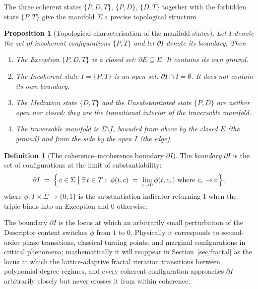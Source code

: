 \documentclass[11pt,a4paper]{article}
\newtheorem{proposition}[theorem]{Proposition}
\theoremstyle{definition}
\newtheorem{definition}[theorem]{Definition}
\theoremstyle{remark}
\newcommand{\eps}{\varepsilon}
\begin{document}
The three coherent states $\{P,D,T\}$, $\{P,D\}$, $\{D,T\}$ together with the forbidden state $\{P,T\}$ give the manifold $\Sigma$ a precise topological structure.

\begin{proposition}[Topological characterisation of the manifold states]\label{prop:topology}
Let $I$ denote the set of incoherent configurations $\{P,T\}$ and let $\partial I$ denote its boundary. Then
\begin{enumerate}[label=(\roman*),leftmargin=*]
\item The Exception $\{P,D,T\}$ is a closed set: $\partial E \subseteq E$. It contains its own ground.
\item The Incoherent state $I = \{P,T\}$ is an open set: $\partial I \cap I = \emptyset$. It does not contain its own boundary.
\item The Mediation state $\{D,T\}$ and the Unsubstantiated state $\{P,D\}$ are neither open nor closed; they are the transitional interior of the traversable manifold.
\item The traversable manifold is $\Sigma \setminus I$, bounded from above by the closed $E$ (the ground) and from the side by the open $I$ (the edge).
\end{enumerate}
\end{proposition}

\begin{definition}[The coherence--incoherence boundary $\partial I$]\label{def:dI}
The \emph{boundary} $\partial I$ is the set of configurations at the limit of substantiability:
\[
\partial I \;=\; \Bigl\{\, c \in \Sigma \;\big|\; \exists\, t\in T :\; \phi(t,c) \;=\; \lim_{\eps\to 0}\phi(t, c_{\eps})\text{ where }c_{\eps}\to c \,\Bigr\},
\]
where $\phi : T \times \Sigma \to \{0,1\}$ is the substantiation indicator returning $1$ when the triple binds into an Exception and $0$ otherwise.
\end{definition}

The boundary $\partial I$ is the locus at which an arbitrarily small perturbation of the Descriptor content switches $\phi$ from $1$ to $0$. Physically it corresponds to second-order phase transitions, classical turning points, and marginal configurations in critical phenomena; mathematically it will reappear in Section~\ref{sec:fractal} as the locus at which the lattice-adaptive fractal iteration transitions between polynomial-degree regimes, and every coherent configuration approaches $\partial I$ arbitrarily closely but never crosses it from within coherence.
\end{document}

